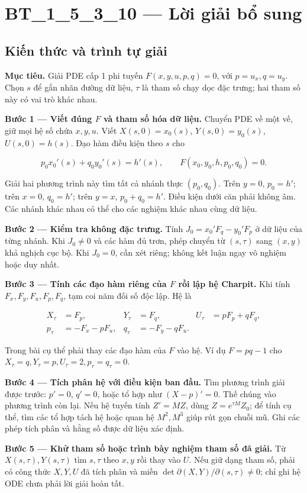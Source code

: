 \documentclass[10pt,a4paper]{article}
\begin{document}
\section*{BT\_1\_5\_3\_10 — Lời giải bổ sung}
\subsection*{Kiến thức và trình tự giải}
\textbf{Mục tiêu.} Giải PDE cấp 1 phi tuyến $F(x,y,u,p,q)=0$, với $p=u_x,q=u_y$. Chọn $s$ để gắn nhãn đường dữ liệu, $\tau$ là tham số chạy dọc đặc trưng; hai tham số này có vai trò khác nhau.

\textbf{Bước 1 — Viết đúng $F$ và tham số hóa dữ liệu.} Chuyển PDE về một vế, giữ mọi hệ số chứa $x,y,u$. Viết $X(s,0)=x_0(s)$, $Y(s,0)=y_0(s)$, $U(s,0)=h(s)$. Đạo hàm điều kiện theo $s$ cho

\[
p_0x_0'(s)+q_0y_0'(s)=h'(s),\qquad
F(x_0,y_0,h,p_0,q_0)=0.
\]

Giải hai phương trình này tìm tất cả nhánh thực $(p_0,q_0)$. Trên $y=0$, $p_0=h'$; trên $x=0$, $q_0=h'$; trên $y=x$, $p_0+q_0=h'$. Điều kiện dưới căn phải không âm. Các nhánh khác nhau có thể cho các nghiệm khác nhau cùng dữ liệu.

\textbf{Bước 2 — Kiểm tra không đặc trưng.} Tính $J_0=x_0'F_q-y_0'F_p$ ở dữ liệu của từng nhánh. Khi $J_0\ne0$ và các hàm đủ trơn, phép chuyển từ $(s,\tau)$ sang $(x,y)$ khả nghịch cục bộ. Khi $J_0=0$, cần xét riêng; không kết luận ngay vô nghiệm hoặc duy nhất.

\textbf{Bước 3 — Tính các đạo hàm riêng của $F$ rồi lập hệ Charpit.} Khi tính $F_x,F_y,F_u,F_p,F_q$, tạm coi năm đối số độc lập. Hệ là

\[
\begin{aligned}
X_\tau&=F_p,&Y_\tau&=F_q,&U_\tau&=pF_p+qF_q,\\
p_\tau&=-F_x-pF_u,&q_\tau&=-F_y-qF_u.
\end{aligned}
\]

Trong bài cụ thể phải thay các đạo hàm của $F$ vào hệ. Ví dụ $F=pq-1$ cho $X_\tau=q,Y_\tau=p,U_\tau=2,p_\tau=q_\tau=0$.

\textbf{Bước 4 — Tích phân hệ với điều kiện ban đầu.} Tìm phương trình giải được trước: $p'=0$, $q'=0$, hoặc tổ hợp như $(X-p)'=0$. Thế chúng vào phương trình còn lại. Nếu hệ tuyến tính $Z'=MZ$, dùng $Z=e^{\tau M}Z_0$; để tính cụ thể, tìm các tổ hợp tách hệ hoặc quan hệ $M^2, M^3$ giúp rút gọn chuỗi mũ. Ghi các phép tích phân và hằng số được dữ liệu xác định.

\textbf{Bước 5 — Khử tham số hoặc trình bày nghiệm tham số đã giải.} Từ $X(s,\tau),Y(s,\tau)$ tìm $s,\tau$ theo $x,y$ rồi thay vào $U$. Nếu giữ dạng tham số, phải có công thức $X,Y,U$ đã tích phân và miền $\det\partial(X,Y)/\partial(s,\tau)\ne0$; chỉ ghi hệ ODE chưa phải lời giải hoàn tất.
\end{document}
